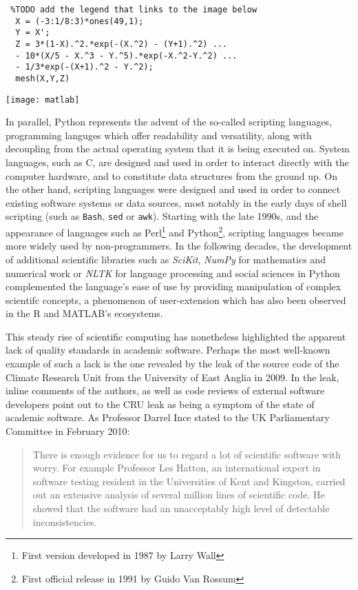 \begin{lstlisting} %TODO add the legend that links to the image below
  X = (-3:1/8:3)*ones(49,1);
  Y = X';
  Z = 3*(1-X).^2.*exp(-(X.^2) - (Y+1).^2) ...
  - 10*(X/5 - X.^3 - Y.^5).*exp(-X.^2-Y.^2) ...
  - 1/3*exp(-(X+1).^2 - Y.^2);
  mesh(X,Y,Z)
\end{lstlisting}

\texttt{[image: matlab]}

In parallel, Python represents the advent of the so-called scripting languages, programming  languges which offer readability and versatility, along with decoupling from the actual operating system that it is being executed on. System languages, such as C, are designed and used in order to interact directly with the computer hardware, and to constitute data structures from the ground up\cite{ousterhout_scripting_1998}. On the other hand, scripting languages were designed and used in order to connect existing software systems or data sources, most notably in the early days of shell scripting (such as \lstinline{Bash}, \lstinline{sed} or \lstinline{awk}). Starting with the late 1990s, and the appearance of languages such as Perl\footnote{First version developed in 1987 by Larry Wall} and Python\footnote{First official release in 1991 by Guido Van Rossum}, scripting languages became more widely used by non-programmers. In the following decades, the development of additional scientific libraries such as \emph{SciKit}, \emph{NumPy} for mathematics and numerical work or \emph{NLTK} for language processing and social sciences in Python complemented the language's ease of use by providing manipulation of complex scientifc concepts\cite{millman_python_2011}, a phenomenon of user-extension which has also been observed in the R and MATLAB's ecosystems\cite{moler_history_2020}.

This steady rise of scientific computing has nonetheless highlighted the apparent lack of quality standards in academic software. Perhaps the most well-known example of such a lack is the one revealed by the leak of the source code of the Climate Research Unit from the University of East Anglia in 2009\cite{merali_computational_2010}. In the leak, inline comments of the authors, as well as code reviews of external software developers point out to the CRU leak as being a symptom of the state of academic software. As Professor Darrel Ince stated to the UK Parliamentary Committee in February 2010:

\begin{quote}
There is enough evidence for us to regard a lot of scientific software with worry. For example Professor
Les Hatton, an international expert in software testing resident in the Universities of Kent and Kingston,
carried out an extensive analysis of several million lines of scientific code. He showed that the software had
an unacceptably high level of detectable inconsistencies.\cite{committee_disclosure_2010}
\end{quote}

